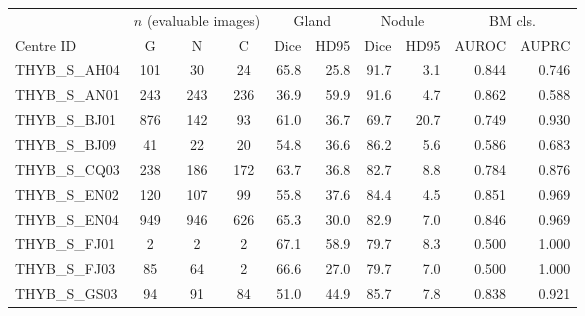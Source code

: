 
\begin{responsetable}
\caption{}
\begin{adjustbox}{max width=\textwidth,center}
\begin{tabular}{@{}l *{3}{c} *{6}{r} @{}}
\toprule
 & \multicolumn{3}{c}{$n$ (evaluable images)} & \multicolumn{2}{c}{Gland} & \multicolumn{2}{c}{Nodule} & \multicolumn{2}{c}{BM cls.} \\
\cmidrule(lr){2-4}\cmidrule(lr){5-6}\cmidrule(lr){7-8}\cmidrule(lr){9-10}
{Centre ID} & G & N & C & Dice & HD95 & Dice & HD95 & AUROC & AUPRC \\
\midrule
THYB\_S\_AH04 & 101 & 30 & 24 & 65.8 & 25.8 & 91.7 & 3.1 & 0.844 & 0.746 \\
THYB\_S\_AN01 & 243 & 243 & 236 & 36.9 & 59.9 & 91.6 & 4.7 & 0.862 & 0.588 \\
THYB\_S\_BJ01 & 876 & 142 & 93 & 61.0 & 36.7 & 69.7 & 20.7 & 0.749 & 0.930 \\
THYB\_S\_BJ09 & 41 & 22 & 20 & 54.8 & 36.6 & 86.2 & 5.6 & 0.586 & 0.683 \\
THYB\_S\_CQ03 & 238 & 186 & 172 & 63.7 & 36.8 & 82.7 & 8.8 & 0.784 & 0.876 \\
THYB\_S\_EN02 & 120 & 107 & 99 & 55.8 & 37.6 & 84.4 & 4.5 & 0.851 & 0.969 \\
THYB\_S\_EN04 & 949 & 946 & 626 & 65.3 & 30.0 & 82.9 & 7.0 & 0.846 & 0.969 \\
THYB\_S\_FJ01 & 2 & 2 & 2 & 67.1 & 58.9 & 79.7 & 8.3 & 0.500 & 1.000 \\
THYB\_S\_FJ03 & 85 & 64 & 2 & 66.6 & 27.0 & 79.7 & 7.0 & 0.500 & 1.000 \\
THYB\_S\_GS03 & 94 & 91 & 84 & 51.0 & 44.9 & 85.7 & 7.8 & 0.838 & 0.921 \\

\end{tabular}
\end{adjustbox}
\end{responsetable}
